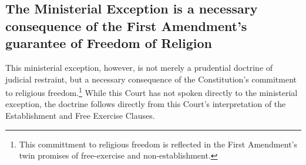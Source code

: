 \documentclass[12pt,\documentclassflag]{FRAP_Brief}
\begin{document}
\subsection{The Ministerial Exception is a necessary consequence of the First Amendment's guarantee of Freedom of Religion}

This ministerial exception, however, is not merely a prudential doctrine of judicial restraint, but a necessary consequence of the Constitution's commitment to religious freedom.\footnote{This committment to religious freedom is reflected in the First Amendment's twin promises of free-exercise and non-establishment.} While this Court has not spoken directly to the ministerial exception, the doctrine follows directly from this Court's interpretation of the Establishment and Free Exercise Clauses. 

\makeendmatter 
\end{document}
